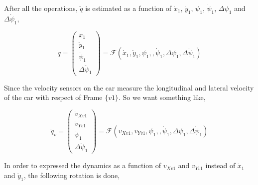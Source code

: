 \documentclass[12pt]{article}
\begin{document}
After all the operations, $\ddot{q}$ is estimated as a function of $\dot{x}_1$, $\dot{y}_1$, $\psi_1$, $\dot{\psi}_1$, $\Delta \psi _1$ and $\Delta \dot{\psi}_1$,

\begin{equation}
    \ddot{q} = \begin{pmatrix} \ddot{x}_1 \\ \ddot{y}_1 \\ \ddot{\psi}_1 \\ \Delta \ddot{\psi}_1 \end{pmatrix} = \mathcal{F} (\dot{x}_1,\dot{y}_1,\psi_1,,\dot{\psi}_1,\Delta \psi_1, \Delta \dot{\psi}_1)
\end{equation}

Since the velocity sensors on the car measure the longitudinal and lateral velocity of the car with respect of Frame $\{ v1 \}$. So we want something like,

\begin{equation}
    \ddot{q}_v = \begin{pmatrix} \dot{v}_{Xv1} \\ \dot{v}_{Yv1} \\ \ddot{\psi}_1 \\ \Delta \ddot{\psi}_1 \end{pmatrix} = \mathcal{F}(v_{Xv1},v_{Yv1},\psi_1,,\dot{\psi}_1,\Delta \psi_1, \Delta \dot{\psi}_1)
\end{equation}

In order to expressed the dynamics as a function of $v_{Xv1}$ and $v_{Yv1}$ instead of $\dot{x}_1$ and $\dot{y}_1$, the following rotation is done,
\end{document}
